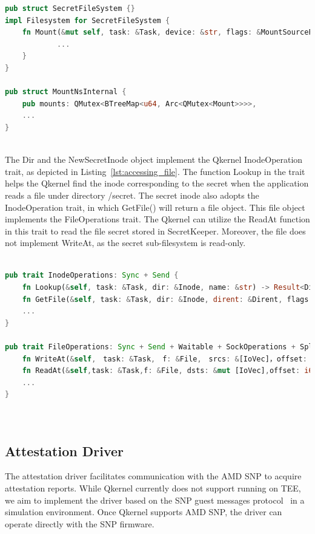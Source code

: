 \begin{lstlisting}[language=rust, caption= API for secret file system, label={lst:sub_filesystem}]
pub struct SecretFileSystem {}
impl Filesystem for SecretFileSystem {
    fn Mount(&mut self, task: &Task, device: &str, flags: &MountSourceFlags, data: &str) -> Result<Inode> {
            ...
    }
}

pub struct MountNsInternal {
    pub mounts: QMutex<BTreeMap<u64, Arc<QMutex<Mount>>>>,
    ...
}
      
\end{lstlisting}

The Dir and the NewSecretInode object implement the Qkernel InodeOperation trait, as depicted in Listing~\ref{lst:accessing_file}. The function Lookup in the trait helps the Qkernel find the inode corresponding to the secret when the application reads a file under directory /secret. The secret inode also adopts the InodeOperation trait, 
in which GetFile() will return a file object. This file object implements the FileOperations trait. The Qkernel can utilize the ReadAt function in this trait to read the file secret stored in SecretKeeper. Moreover, the file does not implement WriteAt, as the secret sub-filesystem is read-only.

\begin{lstlisting}[language=rust, caption= Interface for accessing the file type secrets, label={lst:accessing_file}]

pub trait InodeOperations: Sync + Send {
    fn Lookup(&self, task: &Task, dir: &Inode, name: &str) -> Result<Dirent>;
    fn GetFile(&self, task: &Task, dir: &Inode, dirent: &Dirent, flags: FileFlags) -> Result<File>;
    ...
}

pub trait FileOperations: Sync + Send + Waitable + SockOperations + SpliceOperations {
    fn WriteAt(&self,　task: &Task,　f: &File,　srcs: &[IoVec]，offset: i64,_blocking: bool) -> Result<i64>;
    fn ReadAt(&self,task: &Task,f: &File, dsts: &mut [IoVec],offset: i64, _blocking: bool,) -> Result<i64>;
    ...
}
    
      
\end{lstlisting}

\subsection{Attestation Driver}
The attestation driver facilitates communication with the AMD SNP to acquire attestation reports. While Qkernel currently does not support running on \acrshort{TEE}, we aim to implement the driver based on the SNP  guest messages protocol~\cite*{snp_firmware} in a simulation environment. Once Qkernel supports 
AMD SNP, the driver can operate directly with the SNP firmware. 


